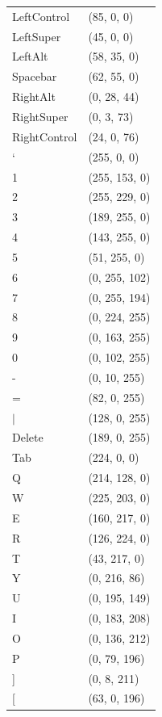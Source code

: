 \documentclass{report}
\begin{document}
\centering
\small
\begin{supertabular}{ll}
	LeftControl & (85, 0, 0)\\
	LeftSuper & (45, 0, 0)\\
	LeftAlt & (58, 35, 0)\\
	Spacebar & (62, 55, 0)\\
	RightAlt & (0, 28, 44)\\
	RightSuper & (0, 3, 73)\\
	RightControl & (24, 0, 76)\\
	` & (255, 0, 0)\\
	1 & (255, 153, 0)\\
	2 & (255, 229, 0)\\
	3 & (189, 255, 0)\\
	4 & (143, 255, 0)\\
	5 & (51, 255, 0)\\
	6 & (0, 255, 102)\\
	7 & (0, 255, 194)\\
	8 & (0, 224, 255)\\
	9 & (0, 163, 255)\\
	0 & (0, 102, 255)\\
	- & (0, 10, 255)\\
	= & (82, 0, 255)\\
	$\vert$ & (128, 0, 255)\\
	Delete & (189, 0, 255)\\
	Tab & (224, 0, 0)\\
	Q & (214, 128, 0)\\
	W & (225, 203, 0)\\
	E & (160, 217, 0)\\
	R & (126, 224, 0)\\
	T & (43, 217, 0)\\
	Y & (0, 216, 86)\\
	U & (0, 195, 149)\\
	I & (0, 183, 208)\\
	O & (0, 136, 212)\\
	P & (0, 79, 196)\\
	] & (0, 8, 211)\\
	{[} & (63, 0, 196)\\

\end{supertabular}
\end{document}

